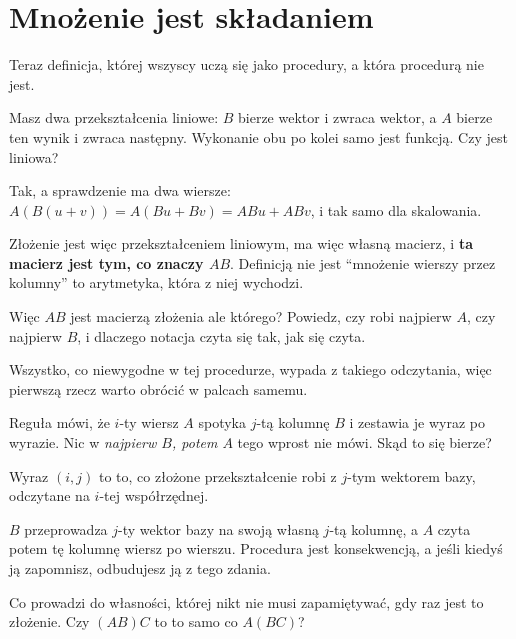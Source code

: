 \section{Mnożenie jest składaniem}
\label{sec:P06-composition}

\begin{fr}
Teraz definicja, której wszyscy uczą się jako procedury, a która procedurą nie
jest.

Masz dwa przekształcenia liniowe: $B$ bierze wektor i zwraca wektor, a $A$
bierze ten wynik i zwraca następny. Wykonanie obu po kolei samo jest funkcją.
Czy jest liniowa?
\nextframe
\end{fr}

\begin{fr}
\begin{ansblock}
Tak, a sprawdzenie ma dwa wiersze: $A(B(u+v)) = A(Bu + Bv) = ABu + ABv$, i tak
samo dla skalowania.
\end{ansblock}

Złożenie jest więc przekształceniem liniowym, ma więc własną macierz, i
\textbf{ta macierz jest tym, co znaczy $AB$}. Definicją nie jest
\enquote{mnożenie wierszy przez kolumny} \dash{} to arytmetyka, która z niej
wychodzi.

Więc $AB$ jest macierzą złożenia \dash{} ale którego? Powiedz, czy robi
najpierw $A$, czy najpierw $B$, i dlaczego notacja czyta się tak, jak się
czyta.
\dotline
\nextframe
\end{fr}

\begin{fr}
Wszystko, co niewygodne w tej procedurze, wypada z takiego odczytania, więc
pierwszą rzecz warto obrócić w palcach samemu.

Reguła mówi, że $i$-ty wiersz $A$ spotyka $j$-tą kolumnę $B$ i zestawia je
wyraz po wyrazie. Nic w \emph{najpierw $B$, potem $A$} tego wprost nie mówi.
Skąd to się bierze?
\dotline
\nextframe
\end{fr}

\begin{fr}
\begin{ansblock}
Wyraz $(i, j)$ to to, co złożone przekształcenie robi z $j$-tym wektorem bazy,
odczytane na $i$-tej współrzędnej.
\end{ansblock}

$B$ przeprowadza $j$-ty wektor bazy na swoją własną $j$-tą kolumnę, a $A$ czyta
potem tę kolumnę wiersz po wierszu. Procedura jest konsekwencją, a jeśli kiedyś
ją zapomnisz, odbudujesz ją z tego zdania.

Co prowadzi do własności, której nikt nie musi zapamiętywać, gdy raz jest to
złożenie. Czy $(AB)C$ to to samo co $A(BC)$?
\nextframe
\end{fr}

